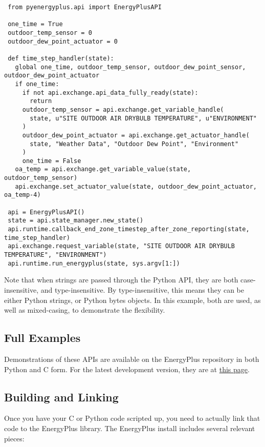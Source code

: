 \begin{lstlisting}
 from pyenergyplus.api import EnergyPlusAPI

 one_time = True
 outdoor_temp_sensor = 0
 outdoor_dew_point_actuator = 0

 def time_step_handler(state):
   global one_time, outdoor_temp_sensor, outdoor_dew_point_sensor, outdoor_dew_point_actuator
   if one_time:
     if not api.exchange.api_data_fully_ready(state):
       return
     outdoor_temp_sensor = api.exchange.get_variable_handle(
       state, u"SITE OUTDOOR AIR DRYBULB TEMPERATURE", u"ENVIRONMENT"
     )
     outdoor_dew_point_actuator = api.exchange.get_actuator_handle(
       state, "Weather Data", "Outdoor Dew Point", "Environment"
     )
     one_time = False
   oa_temp = api.exchange.get_variable_value(state, outdoor_temp_sensor)
   api.exchange.set_actuator_value(state, outdoor_dew_point_actuator, oa_temp-4)

 api = EnergyPlusAPI()
 state = api.state_manager.new_state()
 api.runtime.callback_end_zone_timestep_after_zone_reporting(state, time_step_handler)
 api.exchange.request_variable(state, "SITE OUTDOOR AIR DRYBULB TEMPERATURE", "ENVIRONMENT")
 api.runtime.run_energyplus(state, sys.argv[1:])
\end{lstlisting}

Note that when strings are passed through the Python API, they are both case-insensitive, and type-insensitive.
By type-insensitive, this means they can be either Python strings, or Python bytes objects.
In this example, both are used, as well as mixed-casing, to demonstrate the flexibility.

\subsection{Full Examples}\label{subsec:full-examples}

Demonstrations of these APIs are available on the EnergyPlus repository in both Python and C form.
For the latest development version, they are at \href{https://github.com/NREL/EnergyPlus/tree/develop/tst/EnergyPlus/api}{this page}.

\subsection{Building and Linking}\label{subsec:building-and-linking}

Once you have your C or Python code scripted up, you need to actually link that code to the EnergyPlus library.
The EnergyPlus install includes several relevant pieces:

